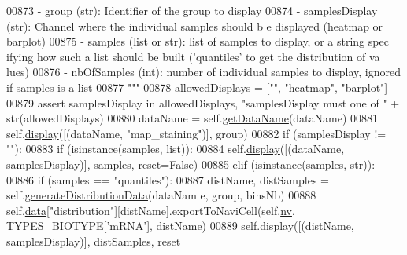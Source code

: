 \begin{DoxyCode}
00873 \textcolor{stringliteral}{            - group (str): Identifier of the group to display}
00874 \textcolor{stringliteral}{            - samplesDisplay (str): Channel where the individual samples should b
      e displayed (heatmap or barplot)}
00875 \textcolor{stringliteral}{            - samples (list or str): list of samples to display, or a string spec
      ifying how such a list should be built ('quantiles' to get the distribution of va
      lues)}
00876 \textcolor{stringliteral}{            - nbOfSamples (int): number of individual samples to display, ignored
       if samples is a list}
\hypertarget{navicom_8py_source_l00877}{}\hyperlink{classnavicom_1_1navicom_1_1NaviCom_a001dadf6f3dc0c77ba5b14da621b110d}{00877} \textcolor{stringliteral}{        """}
00878         allowedDisplays = [\textcolor{stringliteral}{""}, \textcolor{stringliteral}{"heatmap"}, \textcolor{stringliteral}{"barplot"}]
00879         \textcolor{keyword}{assert} samplesDisplay \textcolor{keywordflow}{in} allowedDisplays, \textcolor{stringliteral}{"samplesDisplay must one of "} +
       str(allowedDisplays)
00880         dataName = self.\hyperlink{classnavicom_1_1navicom_1_1NaviCom_a51ecb41beebc7636bde73be2e1ffc407}{getDataName}(dataName)
00881         self.\hyperlink{classnavicom_1_1navicom_1_1NaviCom_ad7d4390d700d4a6d2533647887f8ab94}{display}([(dataName, \textcolor{stringliteral}{"map\_staining"})], group)
00882         \textcolor{keywordflow}{if} (samplesDisplay != \textcolor{stringliteral}{""}):
00883             \textcolor{keywordflow}{if} (isinstance(samples, list)):
00884                 self.\hyperlink{classnavicom_1_1navicom_1_1NaviCom_ad7d4390d700d4a6d2533647887f8ab94}{display}([(dataName, samplesDisplay)], samples, reset=\textcolor{keyword}{False})
00885             \textcolor{keywordflow}{elif} (isinstance(samples, str)):
00886                 \textcolor{keywordflow}{if} (samples == \textcolor{stringliteral}{"quantiles"}):
00887                     distName, distSamples = self.\hyperlink{classnavicom_1_1navicom_1_1NaviCom_a8d417589ac7fb5ab3c26ccd025938504}{generateDistributionData}(dataNam
      e, group, binsNb)
00888                     self.\hyperlink{classnavicom_1_1navicom_1_1NaviCom_aa1abff245573ed8406c6bddb4596f093}{data}[\textcolor{stringliteral}{"distribution"}][distName].exportToNaviCell(self.\hyperlink{classnavicom_1_1navicom_1_1NaviCom_af740fe52f9f3cfc076ae88ca696bd05e}{nv},
       TYPES\_BIOTYPE[\textcolor{stringliteral}{'mRNA'}], distName)
00889                     self.\hyperlink{classnavicom_1_1navicom_1_1NaviCom_ad7d4390d700d4a6d2533647887f8ab94}{display}([(distName, samplesDisplay)], distSamples, reset

\end{DoxyCode}
